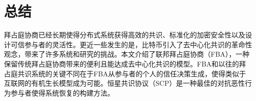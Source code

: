 \section{总结}\label{sec:summary}

拜占庭协商已经长期使得分布式系统获得高效的共识、标准化的加密安全性以及设计可信参与者的灵活性。更近一些发生的是，比特币引入了去中心化共识的革命性观念，带来了许多系统和研究的挑战。本文介绍了联邦拜占庭协商（FBA），一种保留传统拜占庭协商带来的便利且能达成去中心化共识的模型。FBA和以往的拜占庭共识系统的关键不同在于FBA从参与者的个人的信任决策生成{\quorum}，使得类似于互联网的有机生长模型成为可能。恒星共识协议（SCP）是一种最佳的对抗恶性行为参与者使得系统恢复的构建方法。